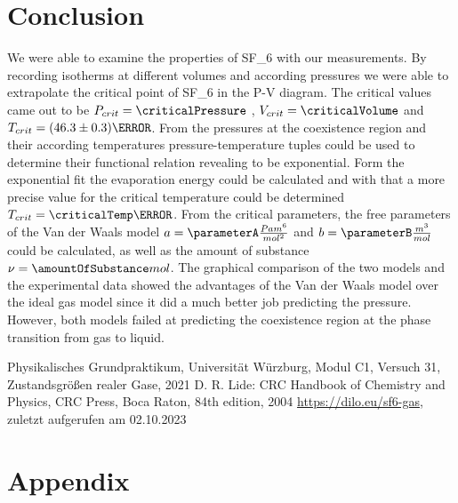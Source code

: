 \documentclass[a4paper,10pt,twocolumn]{article}
\begin{document}
    \section[]{Conclusion}\label{sec:conclusion}
    We were able to examine the properties of SF_6\) with our measurements.
    By recording isotherms at different volumes and according pressures we were able to extrapolate the critical point of SF_6\) in the P-V diagram.
    The critical values came out to be $P_{crit}=\criticalPressure$ , $V_{crit}=\criticalVolume$ and $T_{crit}=(46.3\pm 0.3)\degree$.
    From the pressures at the coexistence region and their according temperatures pressure-temperature tuples could be used to determine their functional
    relation revealing to be exponential.
    Form the exponential fit the evaporation energy could be calculated and with that a more precise value for the critical temperature could be determined
    $T_{crit}=\criticalTemp \degree$.
    From the critical parameters, the free parameters of the Van der Waals model $a=\parameterA \frac{Pa m^6}{mol^2} $ and $b=\parameterB \frac{m^3}{mol} $ could be calculated, as well as the amount of substance
    $\nu = \amountOfSubstance mol$.
    The graphical comparison of the two models and the experimental data showed the advantages of the Van der Waals model over the ideal gas model since it did a much better job predicting
    the pressure.
    However, both models failed at predicting the coexistence region at the phase transition from gas to liquid.
    \begin{thebibliography}{}    %
         Physikalisches Grundpraktikum, Universität Würzburg, Modul C1, Versuch 31, Zustandsgrößen realer Gase, 2021
         D. R. Lide: \grqq CRC Handbook of Chemistry
        and Physics\grqq , CRC Press, Boca Raton, 84th
        edition, 2004
         \url{https://dilo.eu/sf6-gas}, zuletzt aufgerufen am 02.10.2023
    \end{thebibliography}
    \clearpage
    \section[]{Appendix}\label{sec:apendix}
\end{document}

